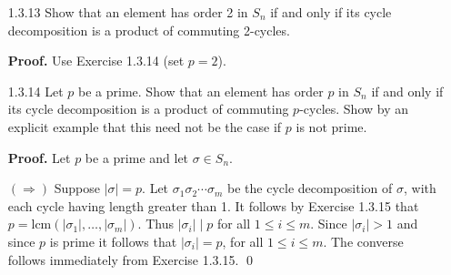 \begin{enumerate}
      \textbf{Solution.}

      \begin{enumerate}
         \item Let $\sigma =  $(1 3 5 7 9 2 4 6 8 10) and $k = 5$.
         \item There is no $n$-cycle $\sigma$ such that $\tau = \sigma^k$ for
               some integer $k$.

               \textbf{Proof.} Suppose to the contrary that there exists an
               $n$-cycle $\sigma$ = ($a_1$ $a_2$ $\ldots$ $a_n$) ($n \ge 5$) and
               positive integer $k$ such that $\tau = \sigma^k$. We can assume
               without loss of generality that $a_1 = 1$. Now we have
               $$a_{k+1} = \sigma^k(a_1) = \tau(a_1) = 2 \text{ so that }
                 a_{2k+1} = \sigma^k(a_{k+1}) = \tau(2) = a_1.$$
               Since $a_{2k+1} = a_1$, it follows that $2k \equiv 0$ mod $n$.
               We must now have that $a_i = 3$ for some $1 < i \le n$. So
               $a_{k+i} = \sigma^k(a_i) = \tau(a_i) = 4$. But
               $$5 = \tau(4) = \tau(a_{k+i}) = \sigma^k(a_{k+i}) = a_{2k+i} =
                 a_i = 3,$$
               a contradiction since $3 \neq 5$. The proof is done. \qed
      \end{enumerate}
   \item[1.3.13]  Show that an element has order 2 in $S_n$ if and only if its
                  cycle decomposition is a product of commuting 2-cycles.

      \textbf{Proof.} Use Exercise 1.3.14 (set $p = 2$).
   \item[1.3.14]  Let $p$ be a prime. Show that an element has order $p$ in
                  $S_n$ if and only if its cycle decomposition is a product of
                  commuting $p$-cycles. Show by an explicit example that this
                  need not be the case if $p$ is not prime.

      \textbf{Proof.} Let $p$ be a prime and let $\sigma \in S_n$.

      $(\Rightarrow)$ Suppose $|\sigma| = p$. Let
      $\sigma_1\sigma_2\cdots\sigma_m$ be the cycle decomposition of $\sigma$,
      with each cycle having length greater than 1. It follows by Exercise
      1.3.15 that $p = \text{lcm}(|\sigma_1|, \ldots, |\sigma_m|)$. Thus
      $|\sigma_i| \mid p$ for all $1 \le i \le m$. Since $|\sigma_i| > 1$ and
      since $p$ is prime it follows that $|\sigma_i| = p$, for all
      $1 \le i \le m$. The converse follows immediately from Exercise 1.3.15.
      \qed


\end{enumerate}
